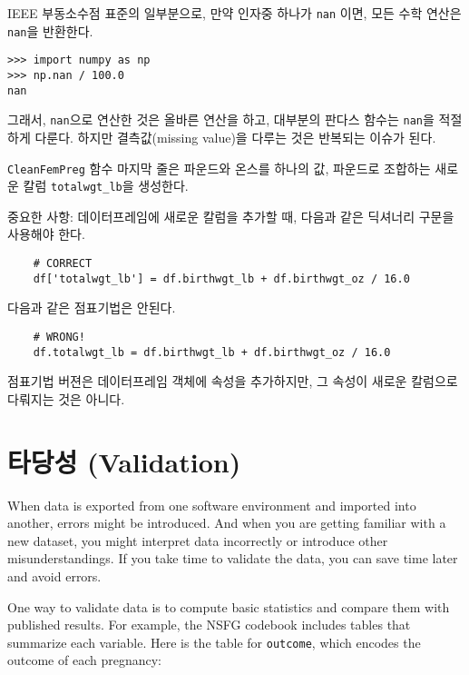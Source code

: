 
IEEE 부동소수점 표준의 일부분으로, 만약 인자중 하나가 {\tt nan} 이면,
모든 수학 연산은 {\tt nan}을 반환한다.

\begin{verbatim}
>>> import numpy as np
>>> np.nan / 100.0
nan
\end{verbatim}

그래서, {\tt nan}으로 연산한 것은 올바른 연산을 하고, 대부분의 판다스 함수는
{\tt nan}을 적절하게 다룬다. 하지만 결측값(missing value)을 다루는 것은 반복되는 이슈가 된다.


{\tt CleanFemPreg} 함수 마지막 줄은 파운드와 온스를 하나의 값, 
파운드로 조합하는 새로운 칼럼 \verb"totalwgt_lb"을 생성한다.

중요한 사항: 데이터프레임에 새로운 칼럼을 추가할 때, 다음과 같은 딕셔너리 구문을 사용해야 한다.


\begin{verbatim}
    # CORRECT
    df['totalwgt_lb'] = df.birthwgt_lb + df.birthwgt_oz / 16.0 
\end{verbatim}

다음과 같은 점표기법은 안된다.

\begin{verbatim}
    # WRONG!
    df.totalwgt_lb = df.birthwgt_lb + df.birthwgt_oz / 16.0 
\end{verbatim}

점표기법 버젼은 데이터프레임 객체에 속성을 추가하지만, 
그 속성이 새로운 칼럼으로 다뤄지는 것은 아니다.

\section{타당성 (Validation)}

When data is exported from one software environment and imported into
another, errors might be introduced.  And when you are
getting familiar with a new dataset, you might interpret data
incorrectly or introduce other misunderstandings.  If you take
time to validate the data, you can save time later and avoid errors.

One way to validate data is to compute basic statistics and compare
them with published results.  For example, the NSFG codebook includes
tables that summarize each variable.  Here is the table for
{\tt outcome}, which encodes the outcome of each pregnancy:

